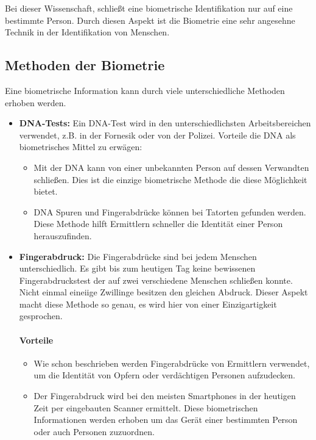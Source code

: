 Bei dieser Wissenschaft, schließt eine biometrische Identifikation nur auf eine bestimmte Person.
Durch diesen Aspekt ist die Biometrie eine sehr angesehne Technik in der Identifikation von Menschen.

\subsection{Methoden der Biometrie}
Eine biometrische Information kann durch viele unterschiedliche Methoden erhoben werden.
\begin{itemize}
	\item \textbf{DNA-Tests:} Ein DNA-Test wird in den unterschiedlichsten Arbeitsbereichen verwendet, z.B. in der Fornesik oder von der Polizei.
	Vorteile die DNA als biometrisches Mittel zu erwägen:
	\begin{itemize}
		\item Mit der DNA kann von einer unbekannten Person auf dessen Verwandten schließen. Dies ist die einzige biometrische Methode die diese Möglichkeit bietet.
		\item DNA Spuren und Fingerabdrücke können bei Tatorten gefunden werden. Diese Methode hilft Ermittlern schneller die Identität einer Person herauszufinden.
	\end{itemize}
	\item \textbf{Fingerabdruck:} Die Fingerabdrücke sind bei jedem Menschen unterschiedlich. 
	Es gibt bis zum heutigen Tag keine bewissenen Fingerabdruckstest der auf zwei verschiedene Menschen schließen konnte. 
	Nicht einmal eineiige Zwillinge besitzen den gleichen Abdruck.
	Dieser Aspekt macht diese Methode so genau, es wird hier von einer Einzigartigkeit gesprochen.
	\paragraph{Vorteile}
	\begin{itemize}
		\item Wie schon beschrieben werden Fingerabdrücke von Ermittlern verwendet, um die Identität von Opfern oder verdächtigen Personen aufzudecken.
		\item Der Fingerabdruck wird bei den meisten Smartphones in der heutigen Zeit per eingebauten Scanner ermittelt. Diese biometrischen Informationen werden erhoben um das Gerät einer bestimmten Person oder auch Personen zuzuordnen.
	\end{itemize}

\end{itemize}
